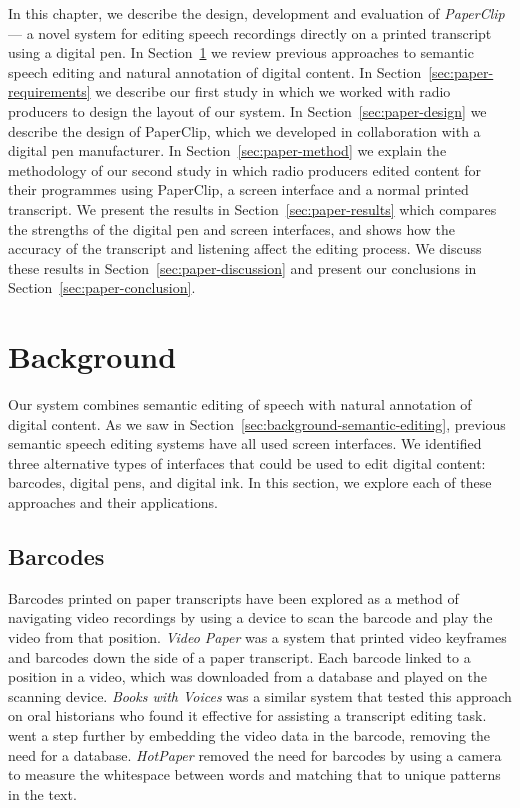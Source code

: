 In this chapter, we describe the design, development and evaluation of \textit{Paper\-Clip} --- a novel system for editing
speech recordings directly on a printed transcript using a digital pen.  In Section~\ref{sec:paper-background} we
review previous approaches to semantic speech editing and natural annotation of digital content. In
Section~\ref{sec:paper-requirements} we describe our first study in which we worked with radio producers to design the
layout of our system. In Section~\ref{sec:paper-design} we describe the design of PaperClip, which we developed in
collaboration with a digital pen manufacturer. In Section~\ref{sec:paper-method} we explain the methodology of our
second study in which radio producers edited content for their programmes using PaperClip, a screen interface and a
normal printed transcript.  We present the results in Section~\ref{sec:paper-results} which compares the strengths of
the digital pen and screen interfaces, and shows how the accuracy of the transcript and listening affect the editing
process.  We discuss these results in Section~\ref{sec:paper-discussion} and present our conclusions in
Section~\ref{sec:paper-conclusion}.


\section{Background}\label{sec:paper-background}


Our system combines semantic editing of speech with natural annotation of digital content. As we saw in
Section~\ref{sec:background-semantic-editing}, previous semantic speech editing systems have all used screen
interfaces. We identified three alternative types of interfaces that could be used to edit digital content:
barcodes,
digital pens,
and digital ink.
In this section, we explore each of these approaches and their applications.

\subsection{Barcodes}
Barcodes printed on paper transcripts have been explored as a method of navigating video recordings by using a device
to scan the barcode and play the video from that position. \textit{Video Paper} \citep{Hull2003} was a system that
printed video keyframes and barcodes down the side of a paper transcript. Each barcode linked to a position in a video,
which was downloaded from a database and played on the scanning device. \textit{Books with Voices} \citep{Klemmer2003}
was a similar system that tested this approach on oral historians who found it effective for assisting a transcript
editing task. \citet{Erol2007} went a step further by embedding the video data in the barcode, removing
the need for a database.  \textit{HotPaper} \citep{Erol2008} removed the need for barcodes by using a camera to measure
the whitespace between words and matching that to unique patterns in the text.

